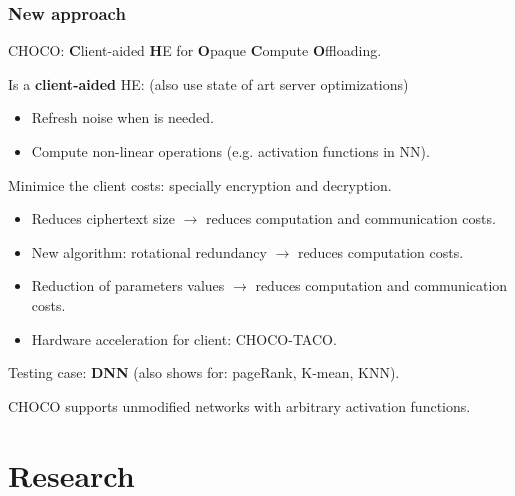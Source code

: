\documentclass[10pt]{beamer}
\begin{document}
\begin{frame}
\frametitle{New approach}
    \vspace{-0.2cm}
CHOCO: \textbf{C}lient-aided \textbf{H}E for \textbf{O}paque \textbf{C}ompute \textbf{O}ffloading.

    \vspace{-0.2cm}
    Is a \textbf{client-aided} HE: (also use state of art server optimizations)
\pause
    \vspace{-0.4cm}
\begin{itemize}\itemsep-0.7em
    \item Refresh noise when is needed.
    \item Compute non-linear operations (e.g. activation functions in NN).
\end{itemize}

\pause
    Minimice the client costs: specially encryption and decryption.
    \vspace{-0.2cm}
\begin{itemize}\itemsep-0.7em
        \item Reduces ciphertext size $\rightarrow$ reduces computation and communication costs.
    \item New algorithm: rotational redundancy $\rightarrow$ reduces computation costs.
\pause
    \item Reduction of parameters values $\rightarrow$ reduces computation and communication costs.
    \item Hardware acceleration for client: CHOCO-TACO.
\end{itemize}
\pause
    Testing case: \textbf{DNN} (also shows for: pageRank, K-mean, KNN).

    CHOCO supports unmodified networks with arbitrary activation functions.

\end{frame}



\section{Research}
\end{document}

